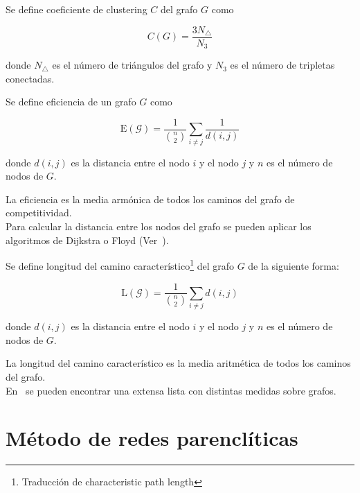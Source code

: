 \begin{defi}
	Se define coeficiente de clustering $C$ del grafo $G$ como
	
	\begin{equation}
	C(G) = \dfrac{3N_{\triangle}}{N_3}
	\end{equation}
	
	donde $N_{\triangle}$ es el número de triángulos del grafo y $N_3$ es el número de tripletas conectadas.
\end{defi}

\begin{defi}
	Se define eficiencia de un grafo $G$ como
	
	\begin{equation}
	\mathrm{E}(\mathcal{G}) = \dfrac{1}{\binom{n}{2}} \sum_{i\neq j} \dfrac{1}{d(i,j)}
	\end{equation}
	
	donde $d(i,j)$ es la distancia entre el nodo $i$ y el nodo $j$ y $n$ es el número de nodos de $G$.
\end{defi}

La eficiencia es la media armónica de todos los caminos del grafo de competitividad.\\

Para calcular la distancia entre los nodos del grafo se pueden aplicar los algoritmos de Dijkstra o Floyd (Ver~\cite{Cormen:2001:IA:580470}).

\begin{defi}
	Se define longitud del camino característico\footnote{Traducción de characteristic path length} del grafo $G$ de la siguiente forma:
	
	\begin{equation}
	\mathrm{L}(\mathcal{G}) = \dfrac{1}{\binom{n}{2}} \sum_{i\neq j} d(i,j)
	\end{equation}
	
	donde $d(i,j)$ es la distancia entre el nodo $i$ y el nodo $j$ y $n$ es el número de nodos de $G$.
\end{defi}

La longitud del camino característico es la media aritmética de todos los caminos del grafo.\\

En~\cite{cond-mat/0505185} se pueden encontrar una extensa lista con distintas medidas sobre grafos. 


\section{Método de redes parenclíticas}

